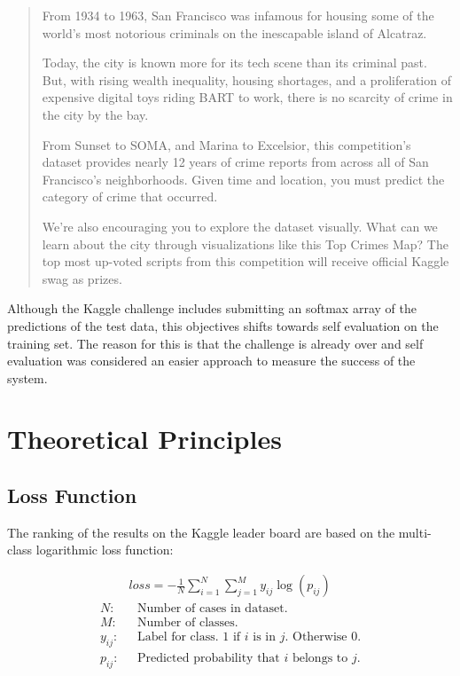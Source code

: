 \documentclass[titlepage,12pt]{article}
\begin{document}
\begin{quote}
From 1934 to 1963, San Francisco was infamous for housing some of the world's most notorious criminals on the inescapable island of Alcatraz.

Today, the city is known more for its tech scene than its criminal past. But, with rising wealth inequality, housing shortages, and a proliferation of expensive digital toys riding BART to work, there is no scarcity of crime in the city by the bay.

From Sunset to SOMA, and Marina to Excelsior, this competition's dataset provides nearly 12 years of crime reports from across all of San Francisco's neighborhoods. Given time and location, you must predict the category of crime that occurred.

We're also encouraging you to explore the dataset visually. What can we learn about the city through visualizations like this Top Crimes Map? The top most up-voted scripts from this competition will receive official Kaggle swag as prizes. 
\end{quote}

Although the Kaggle challenge includes submitting an softmax array of the predictions of the test data, this objectives shifts towards self evaluation on the training set. The reason for this is that the challenge is already over and self evaluation was considered an easier approach to measure the success of the system.

\pagebreak
\section{Theoretical Principles}\label{s:theoretical_principles}
\subsection{Loss Function}\label{ss:loss_function}
The ranking of the results on the Kaggle leader board are based on the multi-class logarithmic loss function:

\begin{align}\label{eqn:loss}
&loss = -\frac1N\sum_{i=1}^N\sum_{j=1}^My_{ij}\log\left(p_{ij}\right)\\
\nonumber
N: & \hspace{8pt} \textrm{Number of cases in dataset.}\\
\nonumber
M: & \hspace{8pt} \textrm{Number of classes.}\\
\nonumber
y_{ij}: & \hspace{8pt} \textrm{Label for class. 1 if $i$ is in $j$. Otherwise 0.}\\
\nonumber
p_{ij}: & \hspace{8pt} \textrm{Predicted probability that $i$ belongs to $j$.}
\end{align}
\end{document}
